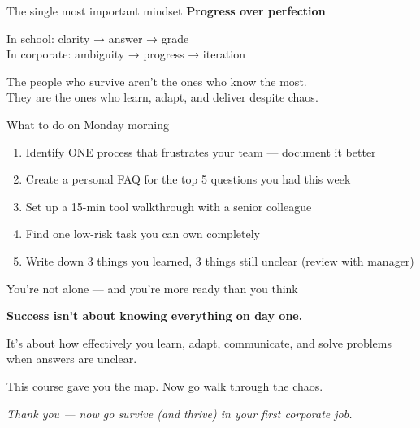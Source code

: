 \documentclass[aspectratio=169, 11pt]{beamer}
\begin{document}
	\begin{frame}{The single most important mindset}
		\centering
		\Large{\textbf{Progress over perfection}}
		\vspace{0.4cm}
		
		In school: clarity → answer → grade \\
		In corporate: ambiguity → progress → iteration
		
		\vspace{0.5cm}
		\alert{The people who survive aren't the ones who know the most.} \\
		They are the ones who learn, adapt, and deliver despite chaos.
	\end{frame}
	
	\begin{frame}{What to do on Monday morning}
		\begin{enumerate}
			\item Identify ONE process that frustrates your team — document it better
			\item Create a personal  FAQ  for the top 5 questions you had this week
			\item Set up a 15-min   tool walkthrough  with a senior colleague
			\item Find one low-risk task you can own completely
			\item Write down 3 things you learned, 3 things still unclear (review with manager)
		\end{enumerate}
	\end{frame}
	
	\begin{frame}{You're not alone — and you're more ready than you think}
		\begin{center}
			\Large{\textbf{Success isn't about knowing everything on day one.}}
			\vspace{0.3cm}
			
			It's about how effectively you learn, adapt, communicate, and solve problems when answers are unclear.
			
			\vspace{0.6cm}
			\alert{This course gave you the map. Now go walk through the chaos.}
			\vspace{0.5cm}
			
			\textit{Thank you — now go survive (and thrive) in your first corporate job.}
		\end{center}
	\end{frame}
	
\end{document}
